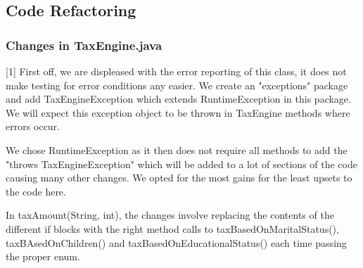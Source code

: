 
\subsection{Code Refactoring}




\subsubsection{Changes in TaxEngine.java}

[1] First off, we are displeased with the error reporting of this class, it does not make testing for error conditions any easier. We create an "exceptions" package and add TaxEngineException which extends RuntimeException in this package. We will expect this exception object to be thrown in TaxEngine methods where errors occur. 

We chose RuntimeException as it then does not require all methods to add the "throws TaxEngineException" which will be added to a lot of sections of the code causing many other changes. We opted for the most gains for the least upsets to the code here. 


In taxAmount(String, int), the changes involve replacing the contents of the different if blocks with the right method calls to taxBasedOnMaritalStatus(), taxBAsedOnChildren() and taxBasedOnEducationalStatus() each time passing the proper enum. 

